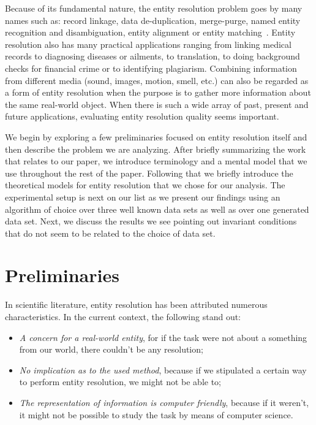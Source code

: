 \documentclass[journal]{IEEEtran}
\begin{document}
    Because of its fundamental nature, the entity resolution problem goes by
    many names such as: record linkage, data de-duplication, merge-purge,
    named entity recognition and disambiguation, entity alignment or entity
    matching~\cite{Tal11,fever2009,alhelbawy2014}.
    Entity resolution also has many practical applications ranging from linking
    medical records to diagnosing diseases or ailments, to translation, to doing
    background checks for financial crime or to identifying plagiarism.
    Combining information from different media (sound, images, motion, smell,
    etc.) can also be regarded as a form of entity resolution when the purpose
    is to gather more information about the same real-world object.
    When there is such a wide array of past, present and future applications,
    evaluating entity resolution quality seems important.
    
    We begin by exploring a few preliminaries focused on entity resolution
    itself and then describe the problem we are analyzing.
    After briefly summarizing the work that relates to our paper, we introduce
    terminology and a mental model that we use throughout the rest of the paper.
    Following that we briefly introduce the theoretical models for entity
    resolution that we chose for our analysis.
    The experimental setup is next on our list as we present our findings using
    an algorithm of choice over three well known data sets as well as over one
    generated data set.
    Next, we discuss the results we see pointing out invariant conditions that
    do not seem to be related to the choice of data set.

    \section{Preliminaries}\label{sec:preliminaries}

    In scientific literature, entity resolution has been attributed numerous
    characteristics\cite{Tal11,Pap19}.
    In the current context, the following stand out:

    \begin{itemize}
        \item\textit{A concern for a real-world entity}, for if the task were
        not about a something from our world, there couldn't be any resolution;
        \item\textit{No implication as to the used method}, because if we
        stipulated a certain way to perform entity resolution, we might not be
        able to;
        \item\textit{The representation of information is computer friendly},
        because if it weren't, it might not be possible to study the task by
        means of computer science.
    \end{itemize}
\end{document}
